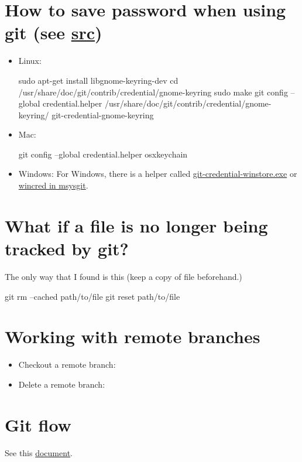 \section{How to save password when using git (see \href{http://stackoverflow.com/questions/5343068/is-there-a-way-to-skip-password-typing-when-using-https-github}{src})}
\begin{itemize}
	\item Linux:\newline
	\begin{bashcode}
		sudo apt-get install libgnome-keyring-dev
		cd /usr/share/doc/git/contrib/credential/gnome-keyring
		sudo make
		git config --global credential.helper
		/usr/share/doc/git/contrib/credential/gnome-keyring/
		git-credential-gnome-keyring
	\end{bashcode}
	\item Mac:\newline
	\begin{bashcode}
		git config --global credential.helper osxkeychain
	\end{bashcode}
	\item Windows:\newline
	For Windows, there is a helper called \href{http://gitcredentialstore.codeplex.com/}{git-credential-winstore.exe} or \href{https://stackoverflow.com/questions/11693074/git-credential-cache-is-not-a-git-command}{wincred in msysgit}.
\end{itemize}
\section{What if a file is no longer being tracked by git?}
The only way that I found is this (keep a copy of file beforehand.)

\begin{bashcode}
	git rm --cached path/to/file
	git reset path/to/file
\end{bashcode}

\section{Working with remote branches}
\begin{itemize}
	\item Checkout a remote branch: 
	\item Delete a remote branch: 
\end{itemize}

\section{Git flow}
See this \href{http://danielkummer.github.io/git-flow-cheatsheet/}{document}.